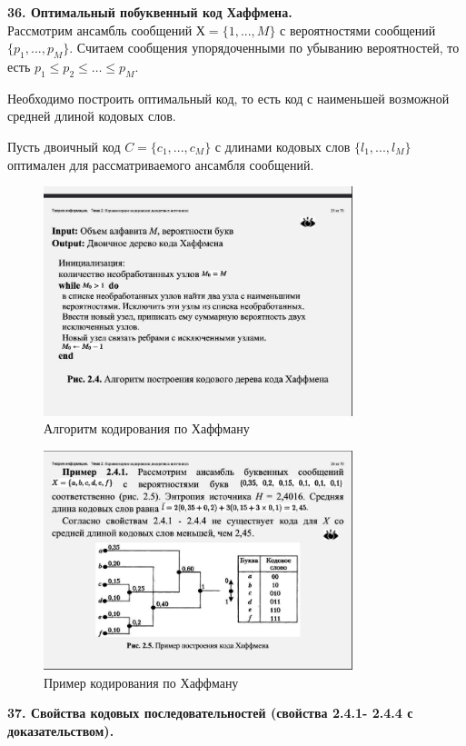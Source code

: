 \documentclass[14pt]{article}
\begin{document}
\bigskip
\textbf{36. Оптимальный побуквенный код Хаффмена.} \\

Рассмотрим ансамбль сообщений \(Х = \{1,...,M\}\) с вероятностями сообщений \(\{p_1,...,p_M\}\). Считаем сообщения упорядоченными по убыванию вероятностей, то есть \(p_1 \leq p_2 \leq \ldots \leq p_M\).

Необходимо построить оптимальный код, то есть код с наименьшей
возможной средней длиной кодовых слов.

Пусть двоичный код \(C = \{c_1,...,c_M\}\) с длинами кодовых слов \(\{l_1,...,l_M\}\) оптимален для рассматриваемого ансамбля сообщений.

\begin{figure}[ht!]
\centering
    \includegraphics[width=90mm]{huffman_1.png}
\caption{Алгоритм кодирования по Хаффману}
\end{figure}

\begin{figure}[ht!]
\centering
    \includegraphics[width=90mm]{huffman_2.png}
\caption{Пример кодирования по Хаффману}
\end{figure}

\bigskip
\textbf{37. Свойства кодовых последовательностей (свойства 2.4.1- 2.4.4 с доказательством).} \\
\end{document}
